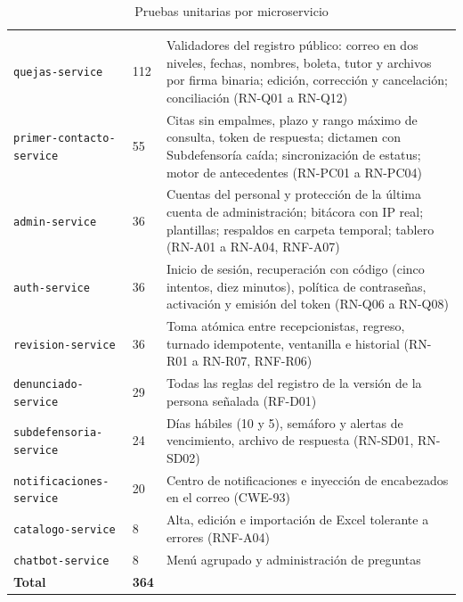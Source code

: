 	\small
	\renewcommand{\arraystretch}{1.2}
	\setlength{\tabcolsep}{4pt}
	\begin{longtable}{|p{3.4cm}|L{1.3cm}|L{9.8cm}|}
		\caption{Pruebas unitarias por microservicio}
		\label{tab:pruebas_unitarias} \\
		\hline
		 &  &  \\
		\hline
		\endfirsthead
		\hline
		 &  &  \\
		\hline
		\endhead
		\texttt{quejas-service} & 112 & Validadores del registro público: correo en dos niveles, fechas,
		nombres, boleta, tutor y archivos por firma binaria; edición, corrección y cancelación; conciliación
		(RN-Q01 a RN-Q12) \\ \hline
		\texttt{primer-contacto-service} & 55 & Citas sin empalmes, plazo y rango máximo de consulta,
		token de respuesta; dictamen con Subdefensoría caída; sincronización de estatus; motor de
		antecedentes (RN-PC01 a RN-PC04) \\ \hline
		\texttt{admin-service} & 36 & Cuentas del personal y protección de la última cuenta de
		administración; bitácora con IP real; plantillas; respaldos en carpeta temporal; tablero (RN-A01 a
		RN-A04, RNF-A07) \\ \hline
		\texttt{auth-service} & 36 & Inicio de sesión, recuperación con código (cinco intentos, diez
		minutos), política de contraseñas, activación y emisión del token (RN-Q06 a RN-Q08) \\ \hline
		\texttt{revision-service} & 36 & Toma atómica entre recepcionistas, regreso, turnado idempotente,
		ventanilla e historial (RN-R01 a RN-R07, RNF-R06) \\ \hline
		\texttt{denunciado-service} & 29 & Todas las reglas del registro de la versión de la persona
		señalada (RF-D01) \\ \hline
		\texttt{subdefensoria-service} & 24 & Días hábiles (10 y 5), semáforo y alertas de vencimiento,
		archivo de respuesta (RN-SD01, RN-SD02) \\ \hline
		\texttt{notificaciones-service} & 20 & Centro de notificaciones e inyección de encabezados en el
		correo (CWE-93) \\ \hline
		\texttt{catalogo-service} & 8 & Alta, edición e importación de Excel tolerante a errores
		(RNF-A04) \\ \hline
		\texttt{chatbot-service} & 8 & Menú agrupado y administración de preguntas \\ \hline
		\textbf{Total} & \textbf{364} & \\ \hline
	\end{longtable}
	\normalsize

